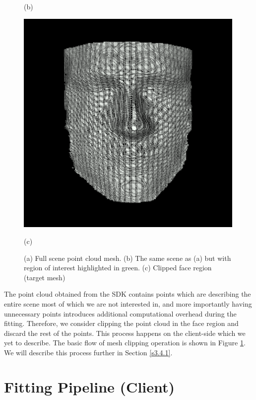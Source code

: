 \begin{figure}
\begin{minipage}{.32\textwidth}
    \caption*{(b)}
  \end{minipage}
  \begin{minipage}{.32\textwidth}
    \centering
    \includegraphics[width=0.99\textwidth]{Figures/Pictures/clip.png}
    \caption*{(c)}
  \end{minipage}
  \caption{(a) Full scene point cloud mesh. (b) The same scene as (a) but with region of interest highlighted in green. (c) Clipped face region (target mesh)}
  \label{f3.8}
\end{figure}

The point cloud obtained from the SDK contains points which are describing the entire scene most of which we are not interested in, and more importantly having unnecessary points introduces additional computational overhead during the fitting. Therefore, we consider clipping the point cloud in the face region and discard the rest of the points. This process happens on the client-side which we yet to describe. The basic flow of mesh clipping operation is shown in Figure \ref{f3.8}. We will describe this process further in Section \ref{s3.4.1}. 


\section{Fitting Pipeline (Client)}\label{s3.4}

